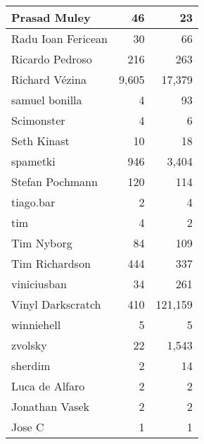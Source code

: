 \documentclass[a4paper,man,natbib,floatsintext]{apa6}
\begin{document}
\begin{table}[ht]
\begin{tabular}{|l|r|r|}
Prasad Muley                   & 46              & 23            \\ \hline
Radu Ioan Fericean             & 30              & 66            \\ \hline
Ricardo Pedroso                & 216             & 263           \\ \hline
Richard Vézina                 & 9,605           & 17,379        \\ \hline
samuel bonilla                 & 4               & 93            \\ \hline
Scimonster                     & 4               & 6             \\ \hline
Seth Kinast                    & 10              & 18            \\ \hline
spametki                       & 946             & 3,404         \\ \hline
Stefan Pochmann                & 120             & 114           \\ \hline
tiago.bar                      & 2               & 4             \\ \hline
tim                            & 4               & 2             \\ \hline
Tim Nyborg                     & 84              & 109           \\ \hline
Tim Richardson                 & 444             & 337           \\ \hline
viniciusban                    & 34              & 261           \\ \hline
Vinyl Darkscratch              & 410             & 121,159       \\ \hline
winniehell                     & 5               & 5             \\ \hline
zvolsky                        & 22              & 1,543         \\ \hline
sherdim                        & 2               & 14            \\ \hline
Luca de Alfaro                 & 2               & 2             \\ \hline
Jonathan Vasek                 & 2               & 2             \\ \hline
Jose C                         & 1               & 1             \\ \hline
\end{tabular}
\end{table}
   \setlength{\parindent}{4em}
   
\end{document}
